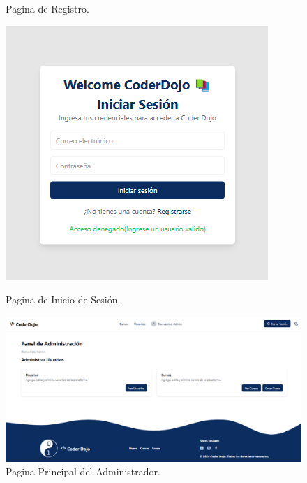 \documentclass{article}
\begin{document}
\begin{figure}[H]
\begin{minipage}{0.45\textwidth}
	\caption{Pagina de Registro.}
	\end{minipage}
	\vspace{1em}
	\begin{minipage}{0.45\textwidth}
		\centering
		\includegraphics[width=\textwidth,keepaspectratio]{img/login.png}
	\caption{Pagina de Inicio de Sesión.}
	\end{minipage}
	\hfill
	\begin{minipage}{0.45\textwidth}
		\centering
		\includegraphics[width=\textwidth,keepaspectratio]{img/adminMain.png}
		\caption{Pagina Principal del Administrador.}
	\end{minipage}
	\vspace{1em}
\end{figure}
\end{document}

